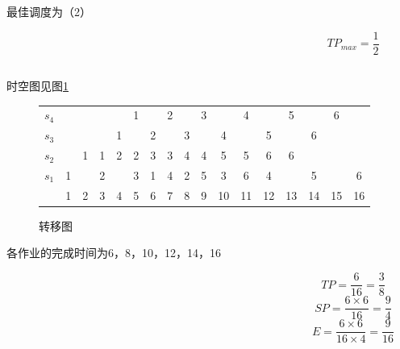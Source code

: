 \documentclass[11pt]{article}
\begin{document}
最佳调度为（2）

\[ TP_{max} = \frac{1}{2} \]

\subsection{}
时空图见图\ref{tab: f2}
\begin{figure}[h!]
  \centering
  \begin{tabular}{c|c|c|c|c|c|c|c|c|c|c|c|c|c|c|c|c|}  %
    \cline{2-17}
    $s_4$& &   &   &   & 1 &   & 2 &   & 3 &   & 4 &   & 5 &   & 6 &  \\ \cline{2-17}
    $s_3$& &   &   & 1 &   & 2 &   & 3 &   & 4 &   & 5 &   & 6 &   &  \\ \cline{2-17}
    $s_2$& & 1 & 1 & 2 & 2 & 3 & 3 & 4 & 4 & 5 & 5 & 6 & 6 &   &   &  \\ \cline{2-17}
    $s_1$&1&   & 2 &   & 3 & 1 & 4 & 2 & 5 & 3 & 6 & 4 &   & 5 &   & 6\\ \cline{2-17}
    \multicolumn{1}{r}{} & \multicolumn{1}{c}{1} & \multicolumn{1}{c}{2} & \multicolumn{1}{c}{3} & \multicolumn{1}{c}{4} & \multicolumn{1}{c}{5} & \multicolumn{1}{c}{6} & \multicolumn{1}{c}{7} & \multicolumn{1}{c}{8} & \multicolumn{1}{c}{9} & \multicolumn{1}{c}{10} & \multicolumn{1}{c}{11} & \multicolumn{1}{c}{12} & \multicolumn{1}{c}{13} & \multicolumn{1}{c}{14} & \multicolumn{1}{c}{15} & \multicolumn{1}{c}{16} \\ 
  \end{tabular}
  \caption{转移图}
  \label{tab: f2}
\end{figure}
各作业的完成时间为6，8，10，12，14，16

\[ TP = \frac{6}{16} = \frac{3}{8} \]
\[ SP = \frac{6\times 6}{16} = \frac{9}{4} \]
\[ E = \frac{6\times 6}{16\times 4} = \frac{9}{16} \]
\end{document}

